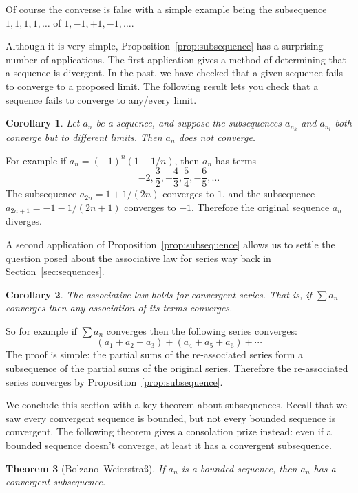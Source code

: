 \documentclass[11pt,oneside]{amsbook}
\theoremstyle{definition}
\theoremstyle{plain}
\newtheorem{theorem}{Theorem}[section]
\newtheorem{corollary}[theorem]{Corollary}
\theoremstyle{definition}
\theoremstyle{remark}
\numberwithin{equation}{section}
\numberwithin{figure}{section}
\begin{document}
Of course the converse is false with a simple example being the subsequence $1,1,1,1,\ldots$ of $1,-1,+1,-1,\ldots$.

Although it is very simple, Proposition~\ref{prop:subsequence} has a surprising number of applications. The first application gives a method of determining that a sequence is divergent. In the past, we have checked that a given sequence fails to converge to a proposed limit. The following result lets you check that a sequence fails to converge to any/every limit.

\begin{corollary}
  \label{cor:divergence}
  Let $a_n$ be a sequence, and suppose the subsequences $a_{n_k}$ and $a_{n_l}$ both converge but to different limits. Then $a_n$ does not converge.
\end{corollary}

For example if $a_n=(-1)^n(1+1/n)$, then $a_n$ has terms
\[-2,\frac32,-\frac{4}{3},\frac54,-\frac{6}{5},\ldots
\]
The subsequence $a_{2n}=1+1/(2n)$ converges to $1$, and the subsequence $a_{2n+1}=-1-1/(2n+1)$ converges to $-1$. Therefore the original sequence $a_n$ diverges.

A second application of Proposition~\ref{prop:subsequence} allows us to settle the question posed about the associative law for series way back in Section~\ref{sec:sequences}.

\begin{corollary}
  The associative law holds for convergent series. That is, if $\sum a_n$ converges then any association of its terms converges.
\end{corollary}

So for example if $\sum a_n$ converges then the following series converges:
\[(a_1+a_2+a_3)+(a_4+a_5+a_6)+\cdots
\]
The proof is simple: the partial sums of the re-associated series form a subsequence of the partial sums of the original series. Therefore the re-associated series converges by Proposition~\ref{prop:subsequence}.

We conclude this section with a key theorem about subsequences. Recall that we saw every convergent sequence is bounded, but not every bounded sequence is convergent. The following theorem gives a consolation prize instead: even if a bounded sequence doesn't converge, at least it has a convergent subsequence.

\begin{theorem}[Bolzano--Weierstra\ss]
  If $a_n$ is a bounded sequence, then $a_n$ has a convergent subsequence.
\end{theorem}
\end{document}
